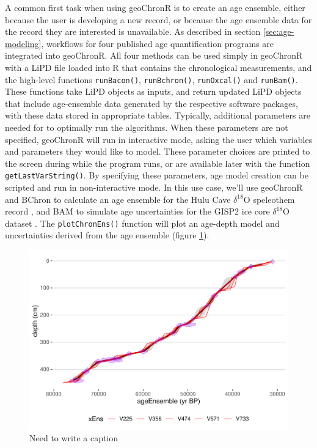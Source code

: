 \documentclass[gc, manuscript]{copernicus}
\begin{document}
A common first task when using geoChronR is to create an age ensemble, either because the user is developing a new record, or because the age ensemble data for the record they are interested is unavailable.
As described in section \ref{sec:age-modeling}, workflows for four published age quantification programs are integrated into geoChronR.
All four methods can be used simply in geoChronR with a LiPD file loaded into R that contains the chronological measurements, and the high-level functions \texttt{runBacon()}, \texttt{runBchron()}, \texttt{runOxcal()} and \texttt{runBam()}.
These functions take LiPD objects as inputs, and return updated LiPD objects that include age-ensemble data generated by the respective software packages, with these data stored in appropriate tables.
Typically, additional parameters are needed for to optimally run the algorithms.
When these parameters are not specified, geoChronR will run in interactive mode, asking the user which variables and parameters they would like to model.
These parameter choices are printed to the screen during while the program runs, or are available later with the function \texttt{getLastVarString()}.
By specifying these parameters, age model creation can be scripted and run in non-interactive mode.
In this use case, we'll use geoChronR and BChron \citep{parnell2008flexible} to calculate an age ensemble for the Hulu Cave \(\delta^{18}\)O speleothem record \citep{hulu2001}, and BAM \citep{BAM} to simulate age uncertainties for the GISP2 ice core \(\delta^{18}\)O dataset \citep{alley}.
The \texttt{plotChronEns()} function will plot an age-depth model and uncertainties derived from the age ensemble (figure \ref{fig:age-model}).

\begin{figure}
\centering
\includegraphics{geoChronR-paper_files/figure-latex/age-model-1.pdf}
\caption{\label{fig:age-model}Need to write a caption}
\end{figure}
\end{document}
